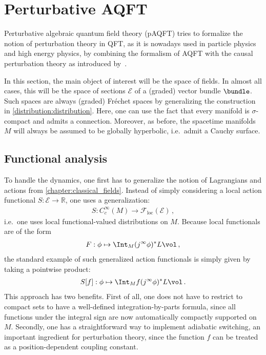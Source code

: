 \section{Perturbative AQFT}

    Perturbative algebraic quantum field theory (pAQFT) tries to formalize the notion of perturbation theory in QFT, as it is nowadays used in particle physics and high energy physics, by combining the formalism of AQFT with the causal perturbation theory as introduced by~\citet{epstein_role_1973}.

    In this section, the main object of interest will be the space of fields. In almost all cases, this will be the space of sections $\mathcal{E}$ of a (graded) vector bundle $\bundle$. Such spaces are always (graded) Fr\'echet spaces by generalizing the construction in \cref{distribution:distribution}. Here, one can use the fact that every manifold is $\sigma$-compact and admits a connection. Moreover, as before, the spacetime manifolds $M$ will always be assumed to be globally hyperbolic, i.e.~admit a Cauchy surface.

\subsection{Functional analysis}

    To handle the dynamics, one first has to generalize the notion of Lagrangians and actions from \cref{chapter:classical_fields}. Instead of simply considering a local action functional $S:\mathcal{E}\rightarrow\mathbb{R}$, one uses a generalization:
    \begin{gather}
        S:C^\infty_c(M)\rightarrow\mathcal{F}_{\text{loc}}(\mathcal{E})\,,
    \end{gather}
    i.e.~one uses local functional-valued distributions on $M$. Because local functionals are of the form
    \begin{gather}
        F:\phi\mapsto\Int_M (j^\infty\phi)^*L\vol\,,
    \end{gather}
    the standard example of such generalized action functionals is simply given by taking a pointwise product:
    \begin{gather}
        S[f]:\phi\mapsto\Int_Mf(j^\infty\phi)^*L\vol\,.
    \end{gather}
    This approach has two benefits. First of all, one does not have to restrict to compact sets to have a well-defined integration-by-parts formula, since all functions under the integral sign are now automatically compactly supported on $M$. Secondly, one has a straightforward way to implement adiabatic switching, an important ingredient for perturbation theory, since the function $f$ can be treated as a position-dependent coupling constant.

